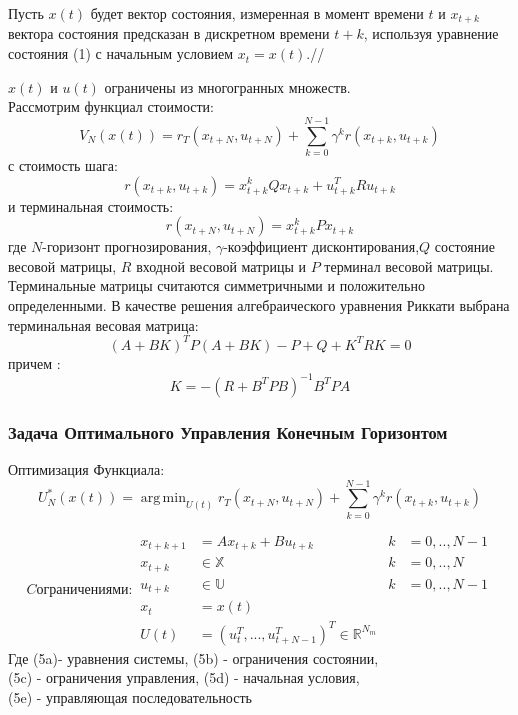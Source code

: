 \documentclass[a4paper,12pt]{article}
\DeclareMathOperator*{\argmin}{arg\,min}
\DeclareMathOperator*{\argmin}{arg\,min}
\begin{document}
Пусть $x(t)$ будет вектор состояния, измеренная в момент времени $t$ и $x_{t+k}$ вектора состояния предсказан в дискретном времени $t+k$, используя уравнение состояния (1) с начальным условием $x_t=x(t)$.//

$x(t)$ и $u(t)$ ограничены из многогранных множеств.\\

Рассмотрим функциал стоимости:
\begin{equation}
    V_N(x(t))=r_T(x_{t+N},u_{t+N})+\sum_{k=0}^{N-1} \gamma^k r(x_{t+k},u_{t+k})
\end{equation}
с стоимость шага:
$$r(x_{t+k},u_{t+k})=x_{t+k}^k Q x_{t+k} + u_{t+k}^T R u_{t+k}$$
и терминальная стоимость:
$$r(x_{t+N},u_{t+N})=x_{t+k}^k P x_{t+k}$$
где $N$-горизонт прогнозирования, $\gamma$-коэффициент дисконтирования,$Q$ состояние весовой матрицы, $R$ входной весовой матрицы и $P$ терминал весовой матрицы.\\

Терминальные матрицы считаются симметричными и положительно определенными.
В качестве решения алгебраического уравнения Риккати выбрана терминальная весовая матрица:
\begin{equation}
    (A+BK)^T P (A+BK)-P+Q+K^T R K=0
\end{equation}
причем :
$$K=-(R+B^T P B)^{-1} B^T P A$$
\subsubsection{Задача Оптимального Управления Конечным Горизонтом}
Оптимизация Функциала:
\begin{equation}
    U_{N}^*(x(t))=\argmin_{U(t)} r_T(x_{t+N},u_{t+N})+\sum_{k=0}^{N-1} \gamma^k r(x_{t+k},u_{t+k})
\end{equation}

\begin{subequations}
C ограничениями:
\begin{align}
    x_{t+k+1} & = Ax_{t+k}+Bu_{t+k}  & k&=0,..,N-1 \\
    x_{t+k} & \in \mathbb{X}  & k&=0,..,N \\
    u_{t+k} & \in \mathbb{U}  & k&=0,..,N-1 \\
    x_t&=x(t) \\
    U(t)&=(u_t^T, ... , u_{t+N-1}^T)^T \in \mathbb{R}^{N_m}
\end{align}
\end{subequations}
Где (5a)- уравнения системы, (5b) - ограничения состоянии, \\ 
\null \qquad (5c) - ограничения управления, (5d) - начальная условия, \\ 
\null \qquad (5e) - управляющая последовательность
\end{document}
